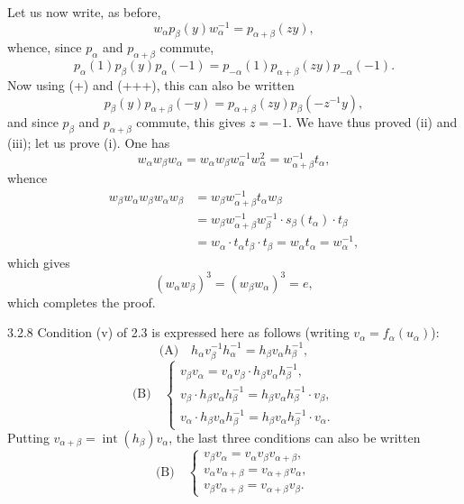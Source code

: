 Let us now write, as before,
\[
w_\alpha p_\beta(y)w_\alpha^{-1}=p_{\alpha+\beta}(zy),
\]
whence, since $p_\alpha$ and $p_{\alpha+\beta}$ commute,
\[
p_\alpha(1)p_\beta(y)p_\alpha(-1)=p_{-\alpha}(1)p_{\alpha+\beta}(zy)p_{-\alpha}(-1).
\]
Now using (+) and (+++), this can also be written
\[
p_\beta(y)p_{\alpha+\beta}(-y)=p_{\alpha+\beta}(zy)p_\beta(-z^{-1}y),
\]
and since $p_\beta$ and $p_{\alpha+\beta}$ commute, this gives $z=-1$.
We have thus proved (ii) and (iii); let us prove (i). One has
\[
w_\alpha w_\beta w_\alpha=w_\alpha w_\beta w_\alpha^{-1}w_\alpha^2=w_{\alpha+\beta}^{-1}t_\alpha,
\]
whence
\[
\begin{aligned}
w_\beta w_\alpha w_\beta w_\alpha w_\beta
&=w_\beta w_{\alpha+\beta}^{-1}t_\alpha w_\beta\\
&=w_\beta w_{\alpha+\beta}^{-1}w_\beta^{-1}\cdot s_\beta(t_\alpha)\cdot t_\beta\\
&=w_\alpha\cdot t_\alpha t_\beta\cdot t_\beta=w_\alpha t_\alpha=w_\alpha^{-1},
\end{aligned}
\]
which gives
\[
(w_\alpha w_\beta)^3=(w_\beta w_\alpha)^3=e,
\]
which completes the proof.
\begin{remark}{3.2.8}\label{XXIII.3.2.8}
Condition (v) of 2.3 is expressed here as follows (writing $v_\alpha=f_\alpha(u_\alpha)$):
\[
\text{(A)}\quad h_\alpha v_\beta^{-1}h_\alpha^{-1}=h_\beta v_\alpha h_\beta^{-1},
\]
\[
\text{(B)}\quad\begin{cases}
v_\beta v_\alpha=v_\alpha v_\beta\cdot h_\beta v_\alpha h_\beta^{-1},\\
v_\beta\cdot h_\beta v_\alpha h_\beta^{-1}=h_\beta v_\alpha h_\beta^{-1}\cdot v_\beta,\\
v_\alpha\cdot h_\beta v_\alpha h_\beta^{-1}=h_\beta v_\alpha h_\beta^{-1}\cdot v_\alpha.
\end{cases}
\]
Putting $v_{\alpha+\beta}=\operatorname{int}(h_\beta)v_\alpha$, the last three conditions can also be written
\[
\text{(B)}\quad\begin{cases}
v_\beta v_\alpha=v_\alpha v_\beta v_{\alpha+\beta},\\
v_\alpha v_{\alpha+\beta}=v_{\alpha+\beta}v_\alpha,\\
v_\beta v_{\alpha+\beta}=v_{\alpha+\beta}v_\beta.
\end{cases}
\]
\end{remark}

